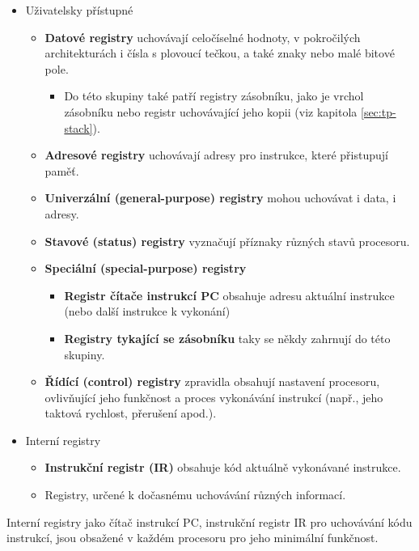 \begin{itemize}
    \item Uživatelsky přístupné
        \begin{itemize}
        \item \textbf{Datové registry} uchovávají celočíselné hodnoty, v pokročilých architekturách
            i čísla s plovoucí tečkou, a také znaky nebo malé bitové pole.
            \begin{itemize}
                \item Do této skupiny také patří registry zásobníku, jako je vrchol zásobníku nebo
                    registr uchovávající jeho kopii (viz kapitola \ref{sec:tp-stack}).
            \end{itemize}
        \item \textbf{Adresové registry} uchovávají adresy pro instrukce, které přistupují paměť.
        \item \textbf{Univerzální (general-purpose) registry} mohou uchovávat i data, i adresy.
        \item \textbf{Stavové (status) registry} vyznačují příznaky různých stavů procesoru.
        \item \textbf{Speciální (special-purpose) registry}
            \begin{itemize}
                \item \textbf{Registr čítače instrukcí PC} obsahuje adresu aktuální instrukce (nebo
                    další instrukce k vykonání)
                \item \textbf{Registry tykající se zásobníku} taky se někdy zahrnují do této skupiny.
            \end{itemize}
        \item \textbf{Řídící (control) registry} zpravidla obsahují nastavení procesoru, ovlivňující
            jeho funkčnost a proces vykonávání instrukcí (např., jeho taktová rychlost, přerušení
            apod.).
        \end{itemize}
    \item Interní registry
        \begin{itemize}
            \item \textbf{Instrukční registr (IR)} obsahuje kód aktuálně vykonávané instrukce.
            \item Registry, určené k dočasnému uchovávání různých informací.
        \end{itemize}
\end{itemize}

Interní registry jako čítač instrukcí PC, instrukční registr IR pro uchovávání kódu instrukcí, jsou
obsažené v každém procesoru pro jeho minimální funkčnost.

